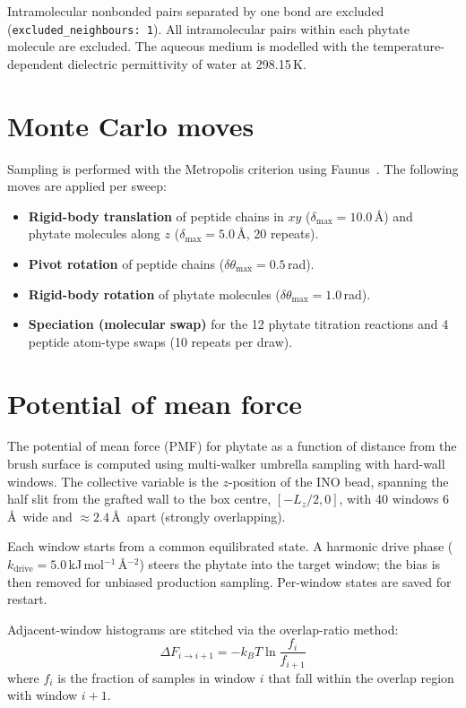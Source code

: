 \documentclass[11pt]{article}
\begin{document}
Intramolecular nonbonded pairs separated by one bond are excluded
(\texttt{excluded\_neighbours:~1}).  All intramolecular pairs within
each phytate molecule are excluded.
The aqueous medium is modelled with the temperature-dependent
dielectric permittivity of water at 298.15\,K.

\section{Monte Carlo moves}

Sampling is performed with the Metropolis criterion using
Faunus~\cite{Stenqvist2013}.  The following moves are applied per
sweep:

\begin{itemize}
\item \textbf{Rigid-body translation} of peptide chains in $xy$
      ($\delta_\text{max} = 10.0$\,\AA) and phytate molecules along $z$
      ($\delta_\text{max} = 5.0$\,\AA, 20 repeats).
\item \textbf{Pivot rotation} of peptide chains
      ($\delta\theta_\text{max} = 0.5$\,rad).
\item \textbf{Rigid-body rotation} of phytate molecules
      ($\delta\theta_\text{max} = 1.0$\,rad).
\item \textbf{Speciation (molecular swap)} for the 12 phytate
      titration reactions and 4 peptide atom-type swaps
      (10 repeats per draw).
\end{itemize}

\section{Potential of mean force}

The potential of mean force (PMF) for phytate as a function of
distance from the brush surface is computed using multi-walker
umbrella sampling with hard-wall windows.  The collective variable
is the $z$-position of the INO bead, spanning the half slit from the
grafted wall to the box centre, $[-L_z/2, 0]$, with 40 windows
6\,\AA\ wide and $\approx 2.4$\,\AA\ apart (strongly overlapping).

Each window starts from a common equilibrated state.  A harmonic
drive phase ($k_\text{drive} = 5.0$\,kJ\,mol$^{-1}$\,\AA$^{-2}$)
steers the phytate into the target window; the bias is then removed
for unbiased production sampling.  Per-window states are saved for
restart.

Adjacent-window histograms are stitched via the overlap-ratio method:
\begin{equation}
\Delta F_{i \to i+1} = -k_BT \ln \frac{f_i}{f_{i+1}}
\end{equation}
where $f_i$ is the fraction of samples in window $i$ that fall within
the overlap region with window $i{+}1$.
\end{document}
